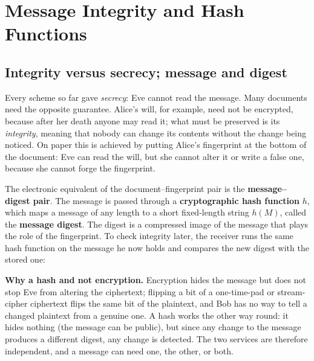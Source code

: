 \section{Message Integrity and Hash Functions}\label{sec:integrity}
\usetikzlibrary{decorations.pathreplacing}

\subsection{Integrity versus secrecy; message and digest \new}

Every scheme so far gave \emph{secrecy}: Eve cannot read the message. Many documents need the opposite guarantee. Alice's will, for example, need not be encrypted, because after her death anyone may read it; what must be preserved is its \emph{integrity}, meaning that nobody can change its contents without the change being noticed. On paper this is achieved by putting Alice's fingerprint at the bottom of the document: Eve can read the will, but she cannot alter it or write a false one, because she cannot forge the fingerprint.

The electronic equivalent of the document--fingerprint pair is the \textbf{message--digest pair}. The message is passed through a \textbf{cryptographic hash function} $h$, which maps a message of any length to a short fixed-length string $h(M)$, called the \textbf{message digest}. The digest is a compressed image of the message that plays the role of the fingerprint. To check integrity later, the receiver runs the same hash function on the message he now holds and compares the new digest with the stored one: 

\textbf{Why a hash and not encryption.} Encryption hides the message but does not stop Eve from altering the ciphertext; flipping a bit of a one-time-pad or stream-cipher ciphertext flips the same bit of the plaintext, and Bob has no way to tell a changed plaintext from a genuine one. A hash works the other way round: it hides nothing (the message can be public), but since any change to the message produces a different digest, any change is detected. The two services are therefore independent, and a message can need one, the other, or both.

